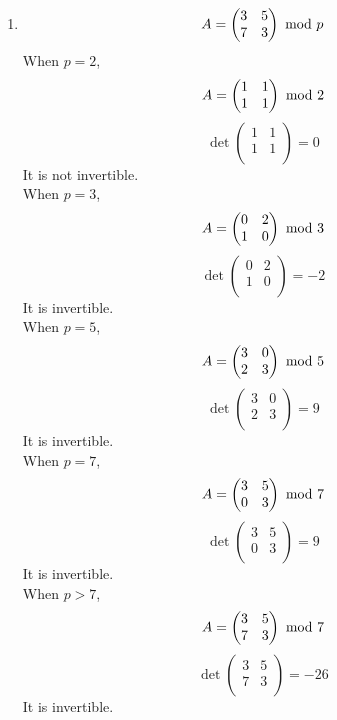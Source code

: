 \documentclass{article}
\renewcommand{\mod}{{\rm\ mod\ }}
\begin{document}
\begin{enumerate}
\item
$$A=\begin{pmatrix}3&5\\7&3\\\end{pmatrix}\mod p$$
When $p=2$, 
$$A=\begin{pmatrix}1&1\\1&1\\\end{pmatrix}\mod 2$$
$$\det\begin{pmatrix}1&1\\1&1\\\end{pmatrix}=0$$
It is not invertible.\\

When $p=3$,
$$A=\begin{pmatrix}0&2\\1&0\\\end{pmatrix}\mod 3$$
$$\det\begin{pmatrix}0&2\\1&0\\\end{pmatrix}=-2$$
It is invertible.\\

When $p=5$,
$$A=\begin{pmatrix}3&0\\2&3\\\end{pmatrix}\mod 5$$
$$\det\begin{pmatrix}3&0\\2&3\\\end{pmatrix}=9$$
It is invertible.\\

When $p=7$,
$$A=\begin{pmatrix}3&5\\0&3\\\end{pmatrix}\mod 7$$
$$\det\begin{pmatrix}3&5\\0&3\\\end{pmatrix}=9$$
It is invertible.\\

When $p>7$,
$$A=\begin{pmatrix}3&5\\7&3\\\end{pmatrix}\mod 7$$
$$\det\begin{pmatrix}3&5\\7&3\\\end{pmatrix}=-26$$
It is invertible.\\


\end{enumerate}
\end{document}

